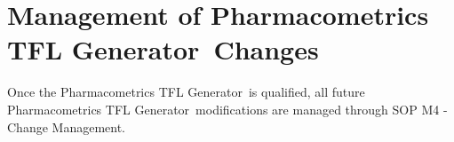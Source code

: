 \documentclass{article}
\newcommand{\tfl}{Pharmacometrics TFL Generator}
\begin{document}
\section*{Management of \tfl\ Changes}
Once the \tfl\ is qualified, all future \tfl\ modifications are managed through SOP M4 - Change Management.




%
%
%
%
%
%
\end{document}
